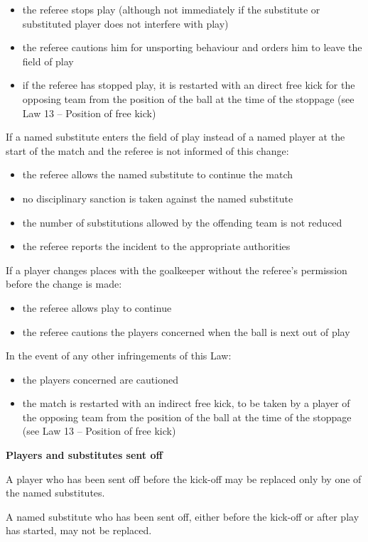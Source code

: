 \begin{itemize}
\item the referee stops play (although not immediately if the substitute or substituted player does not interfere with play)
\item the referee cautions him for unsporting behaviour and orders him to leave the field of play 
\item if the referee has stopped play, it is restarted with an direct free kick
      for the opposing team from the position of the ball at the time of the
      stoppage (see Law 13 -- Position of free kick)
\end{itemize}

\bigskip

If a named substitute enters the field of play instead of a named player at the start of the match and the referee is not informed of this change:

\begin{itemize}
\item the referee allows the named substitute to continue the match 
\item no disciplinary sanction is taken against the named substitute 
\item the number of substitutions allowed by the offending team is not reduced 
\item the referee reports the incident to the appropriate authorities
\end{itemize}

\bigskip

If a player changes places with the goalkeeper without the
referee's permission before the change is made: 

\begin{itemize}
\item the referee allows play to continue
\item the referee cautions the players concerned when the ball is next out of play
\end{itemize}

\bigskip

In the event of any other infringements of this Law:

\begin{itemize}
\item the players concerned are cautioned
\item the match is restarted with an indirect free kick, to be taken by a player of the opposing team from the position of the ball at the time of the stoppage (see Law 13 -- Position of free kick)
\end{itemize}

\bigskip

{\bfseries Players and substitutes sent off}

\headlinebox

A player who has been sent off before the kick-off may be replaced only by one of the named substitutes.

\bigskip

A named substitute who has been sent off, either before the kick-off or after play has started, may not be replaced.

